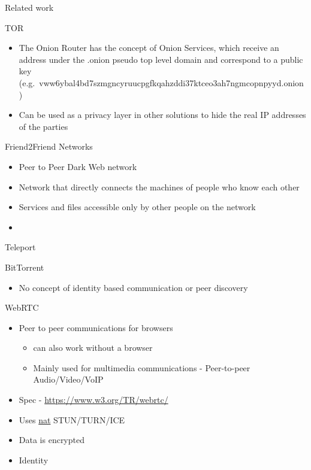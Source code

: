 \begin{frame}[fragile]{Related work}
\begin{block}{TOR}
\protect\hypertarget{tor}{}
\begin{itemize}
\tightlist
\item
  The Onion Router has the concept of Onion Services, which receive an
  address under the .onion pseudo top level domain and correspond to a
  public key
  (e.g.~vww6ybal4bd7szmgncyruucpgfkqahzddi37ktceo3ah7ngmcopnpyyd.onion)
\item
  Can be used as a privacy layer in other solutions to hide the real IP
  addresses of the parties
\end{itemize}
\end{block}

\begin{block}{Friend2Friend Networks}
\protect\hypertarget{friend2friend-networks}{}
\begin{itemize}
\tightlist
\item
  Peer to Peer Dark Web network
\item
  Network that directly connects the machines of people who know each
  other
\item
  Services and files accessible only by other people on the network
\item
\end{itemize}
\end{block}

\begin{block}{Teleport}
\protect\hypertarget{teleport}{}
\end{block}

\begin{block}{BitTorrent}
\protect\hypertarget{bittorrent}{}
\begin{itemize}
\tightlist
\item
  No concept of identity based communication or peer discovery
\end{itemize}
\end{block}

\begin{block}{WebRTC}
\protect\hypertarget{webrtc}{}
\begin{itemize}
\tightlist
\item
  Peer to peer communications for browsers

  \begin{itemize}
  \tightlist
  \item
    can also work without a browser
  \item
    Mainly used for multimedia communications - Peer-to-peer
    Audio/Video/VoIP
  \end{itemize}
\item
  Spec -
  \href{https://www.w3.org/TR/webrtc/\#persistent-information-exposed-by-webrtc}{https://www.w3.org/TR/webrtc/}
\item
  Uses \href{notes/02021-internet-protocol.md}{nat} STUN/TURN/ICE
\item
  Data is encrypted
\item
  Identity


\end{itemize}
\end{block}
\end{frame}
